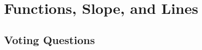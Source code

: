 \section{Functions, Slope, and Lines} \label{S:0.1.Functions}


\newpage

\newpage

\newpage

\newpage

\newpage
% 
\subsection*{Voting Questions}

\newpage
